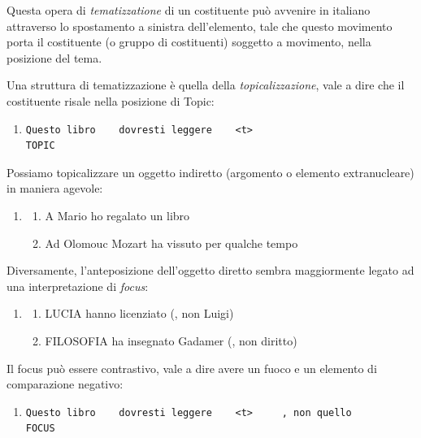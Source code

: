 \documentclass[
  a4paper,
  twoside,
  11pt,
  chapterprefix=false,
  bibliography=totocnumbered,
  listof=flat]{scrbook}
\providecommand{\tightlist}{%
  \setlength{\itemsep}{0pt}\setlength{\parskip}{0pt}}
\begin{document}
Questa opera di \emph{tematizzatione} di un costituente può avvenire in italiano attraverso lo spostamento a sinistra dell'elemento, tale che questo movimento porta il costituente (o gruppo di costituenti) soggetto a movimento, nella posizione del tema.

Una struttura di tematizzazione è quella della \emph{topicalizzazione}, vale a dire che il costituente risale nella posizione di Topic:

\begin{enumerate}
\def\labelenumi{(\arabic{enumi})}
\setcounter{enumi}{163}
\item
\begin{verbatim}
Questo libro    dovresti leggere    <t>
TOPIC
\end{verbatim}
\end{enumerate}

Possiamo topicalizzare un oggetto indiretto (argomento o elemento extranucleare) in maniera agevole:

\begin{enumerate}
\def\labelenumi{(\arabic{enumi})}
\setcounter{enumi}{164}
\item
  \begin{enumerate}
  \def\labelenumii{\alph{enumii}.}
  \tightlist
  \item
    A Mario ho regalato un libro
  \item
    Ad Olomouc Mozart ha vissuto per qualche tempo
  \end{enumerate}
\end{enumerate}

Diversamente, l'anteposizione dell'oggetto diretto sembra maggiormente legato ad una interpretazione di \emph{focus}:

\begin{enumerate}
\def\labelenumi{(\arabic{enumi})}
\setcounter{enumi}{165}
\item
  \begin{enumerate}
  \def\labelenumii{\alph{enumii}.}
  \tightlist
  \item
    LUCIA hanno licenziato (, non Luigi)
  \item
    FILOSOFIA ha insegnato Gadamer (, non diritto)
  \end{enumerate}
\end{enumerate}

Il focus può essere contrastivo, vale a dire avere un fuoco e un elemento di comparazione negativo:

\begin{enumerate}
\def\labelenumi{(\arabic{enumi})}
\setcounter{enumi}{166}
\item
\begin{verbatim}
Questo libro    dovresti leggere    <t>     , non quello
FOCUS
\end{verbatim}
\end{enumerate}
\end{document}
